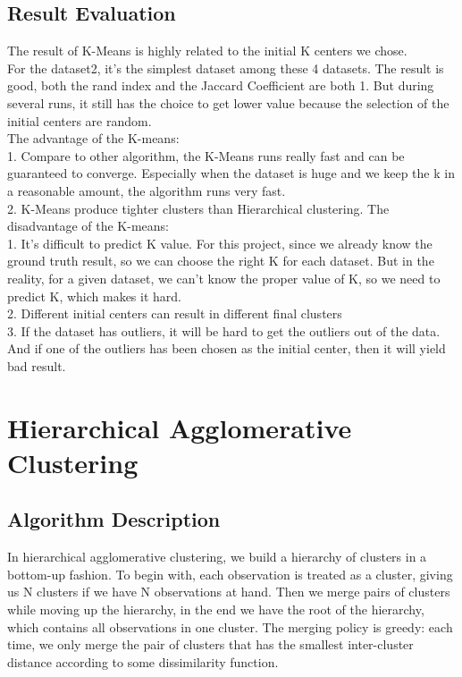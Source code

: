 \documentclass[paper=letter, fontsize=11pt]{article}
\numberwithin{equation}{section}		%
\numberwithin{figure}{section}			%
\numberwithin{table}{section}				%
\begin{document}
\subsection{Result Evaluation}
The result of K-Means is highly related to the initial K centers we chose. \\
For the dataset2, it's the simplest dataset among these 4 datasets. The result is good, both the rand index and the Jaccard Coefficient are both 1. But during several runs, it still has the choice to get lower value because the selection of the initial centers are random.\\
The advantage of the K-means:\\
1. Compare to other algorithm, the K-Means runs really fast and can be guaranteed to converge. Especially when the dataset is huge and we keep the k in a reasonable amount, the algorithm runs very fast. \\
2. K-Means produce tighter clusters than Hierarchical clustering. 
The disadvantage of the K-means:\\
1. It's difficult to predict K value. For this project, since we already know the ground truth result, so we can choose the right K for each dataset. But in the reality, for a given dataset, we can't know the proper value of K, so we need to predict K, which makes it hard.\\
2. Different initial centers can result in different final clusters\\
3. If the dataset has outliers, it will be hard to get the outliers out of the data. And if one of the outliers has been chosen as the initial center, then it will yield bad result.\\
\section{Hierarchical Agglomerative Clustering}
\subsection{Algorithm Description}
In hierarchical  agglomerative clustering, we build a hierarchy of clusters in a bottom-up fashion. To begin with, each observation is treated as a cluster, giving us N clusters if we have N observations at hand. Then we merge pairs of clusters while moving up the hierarchy, in the end we have the root of the hierarchy, which contains all observations in one cluster. The merging policy is greedy: each time, we only merge the pair of clusters that has the smallest inter-cluster distance according to some dissimilarity function.
\end{document}

